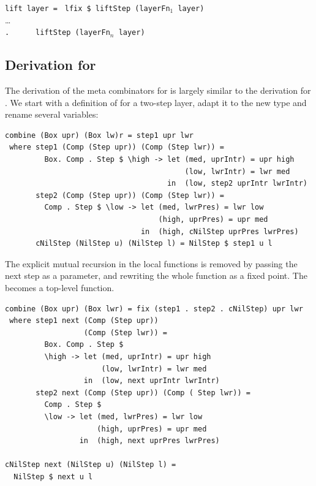 \documentclass{llncs}
\newcommand{\sds}[1]{{\textcolor{blue}\small\marginpar{}}}
\begin{document}
\begin{small}
\begin{tabbing}
{\tt lift layer = } \= {\tt lfix \$ liftStep (layerFn$_1$ layer)} \\
                    \>       \dots \\
                    \> {\tt .~~~~~~liftStep (layerFn$_n$ layer)}\\
\end{tabbing}%
\end{small}
\ec
\subsection{Derivation for } \label{subsubsectcombine}


The derivation of the meta combinators for  is largely similar to the derivation for . We start with a definition of  for a two-step layer, adapt it to the new  type and rename several variables:
\sds{have we mentioned this?}
\begin{small} %
\begin{verbatim}
combine (Box upr) (Box lw)r = step1 upr lwr
 where step1 (Comp (Step upr)) (Comp (Step lwr)) = 
         Box. Comp . Step $ \high -> let (med, uprIntr) = upr high
                                         (low, lwrIntr) = lwr med
                                     in  (low, step2 uprIntr lwrIntr)
       step2 (Comp (Step upr)) (Comp (Step lwr)) = 
         Comp . Step $ \low -> let (med, lwrPres) = lwr low
                                   (high, uprPres) = upr med
                               in  (high, cNilStep uprPres lwrPres)
       cNilStep (NilStep u) (NilStep l) = NilStep $ step1 u l 
\end{verbatim}%
\end{small}

The explicit mutual recursion in the local functions is removed by passing the next step as a parameter, and rewriting the whole function as a fixed point. The  becomes a top-level function.

\begin{small} %
\begin{verbatim}
combine (Box upr) (Box lwr) = fix (step1 . step2 . cNilStep) upr lwr
 where step1 next (Comp (Step upr)) 
                  (Comp (Step lwr)) = 
         Box. Comp . Step $ 
         \high -> let (med, uprIntr) = upr high
                      (low, lwrIntr) = lwr med
                  in  (low, next uprIntr lwrIntr)
       step2 next (Comp (Step upr)) (Comp ( Step lwr)) = 
         Comp . Step $
         \low -> let (med, lwrPres) = lwr low
                     (high, uprPres) = upr med
                 in  (high, next uprPres lwrPres)

cNilStep next (NilStep u) (NilStep l) = 
  NilStep $ next u l
\end{verbatim}%
\end{small}
\end{document}

